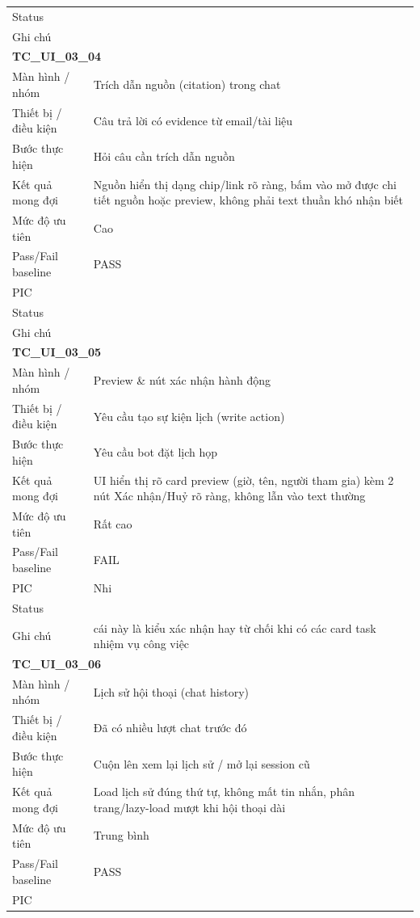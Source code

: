 \documentclass[12pt,a4paper]{article}
\begin{document}
\begin{longtable}{p{3.0cm}p{11.5cm}}
Status &  \\
Ghi chú &  \\
\midrule
\multicolumn{2}{l}{\textbf{TC\_UI\_03\_04}} \\
Màn hình / nhóm & Trích dẫn nguồn (citation) trong chat \\
Thiết bị / điều kiện & Câu trả lời có evidence từ email/tài liệu \\
Bước thực hiện & Hỏi câu cần trích dẫn nguồn \\
Kết quả mong đợi & Nguồn hiển thị dạng chip/link rõ ràng, bấm vào mở được chi tiết nguồn hoặc preview, không phải text thuần khó nhận biết \\
Mức độ ưu tiên & Cao \\
Pass/Fail baseline & PASS \\
PIC &  \\
Status &  \\
Ghi chú &  \\
\midrule
\multicolumn{2}{l}{\textbf{TC\_UI\_03\_05}} \\
Màn hình / nhóm & Preview \& nút xác nhận hành động \\
Thiết bị / điều kiện & Yêu cầu tạo sự kiện lịch (write action) \\
Bước thực hiện & Yêu cầu bot đặt lịch họp \\
Kết quả mong đợi & UI hiển thị rõ card preview (giờ, tên, người tham gia) kèm 2 nút Xác nhận/Huỷ rõ ràng, không lẫn vào text thường \\
Mức độ ưu tiên & Rất cao \\
Pass/Fail baseline & FAIL \\
PIC & Nhi \\
Status &  \\
Ghi chú & cái này là kiểu xác nhận hay từ chối khi có các card task nhiệm vụ công việc \\
\midrule
\multicolumn{2}{l}{\textbf{TC\_UI\_03\_06}} \\
Màn hình / nhóm & Lịch sử hội thoại (chat history) \\
Thiết bị / điều kiện & Đã có nhiều lượt chat trước đó \\
Bước thực hiện & Cuộn lên xem lại lịch sử / mở lại session cũ \\
Kết quả mong đợi & Load lịch sử đúng thứ tự, không mất tin nhắn, phân trang/lazy-load mượt khi hội thoại dài \\
Mức độ ưu tiên & Trung bình \\
Pass/Fail baseline & PASS \\
PIC &  \\

\end{longtable}
\end{document}
